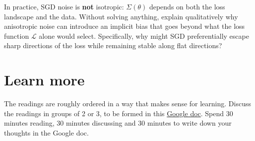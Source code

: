 \documentclass[11pt]{article}
\begin{document}
\begin{exercise}
\label{ex:td-6c}
In practice, SGD noise is \textbf{not} isotropic:
\(\Sigma(\theta)\) depends on both the loss landscape and the data.
Without solving anything, explain qualitatively why anisotropic noise
can introduce an implicit bias that goes beyond what the loss function
\(\mathcal{L}\) alone would select. Specifically, why might SGD
preferentially escape sharp directions of the loss while remaining
stable along flat directions?
\end{exercise}


\section*{Learn more}

The readings are roughly ordered in a way that makes sense for learning. Discuss the readings in groups of 2 or 3, to be formed in this \href{https://docs.google.com/document/d/13u-zhLUnAT9Wzn2IUsbNUOt9vNE5u8QV8GV1NAr1gow/edit?tab=t.0}{Google doc}. Spend 30 minutes reading, 30 minutes discussing and 30 minutes to write down your thoughts in the Google doc.
\end{document}
